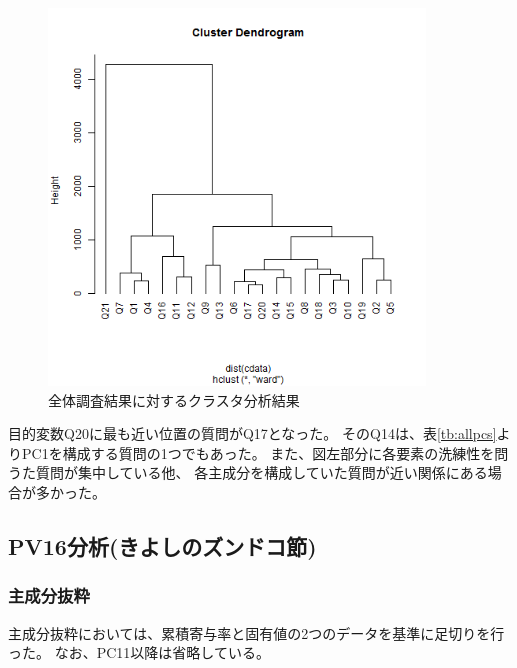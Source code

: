 \documentclass[11pt,a4paper, uplatex]{jsarticle}
\begin{document}
\begin{figure}[h]
  \begin{center}
    \includegraphics[width=10cm]{clusterALL.bmp}
    \caption{全体調査結果に対するクラスタ分析結果}
    \label{fig:clusterALL}
  \end{center}
\end{figure}
目的変数Q20に最も近い位置の質問がQ17となった。
そのQ14は、表\ref{tb:allpcs}よりPC1を構成する質問の1つでもあった。
また、図左部分に各要素の洗練性を問うた質問が集中している他、
各主成分を構成していた質問が近い関係にある場合が多かった。

\subsection{PV16分析(きよしのズンドコ節)}
\subsubsection{主成分抜粋}
主成分抜粋においては、累積寄与率と固有値の2つのデータを基準に足切りを行った。
なお、PC11以降は省略している。
\end{document}
